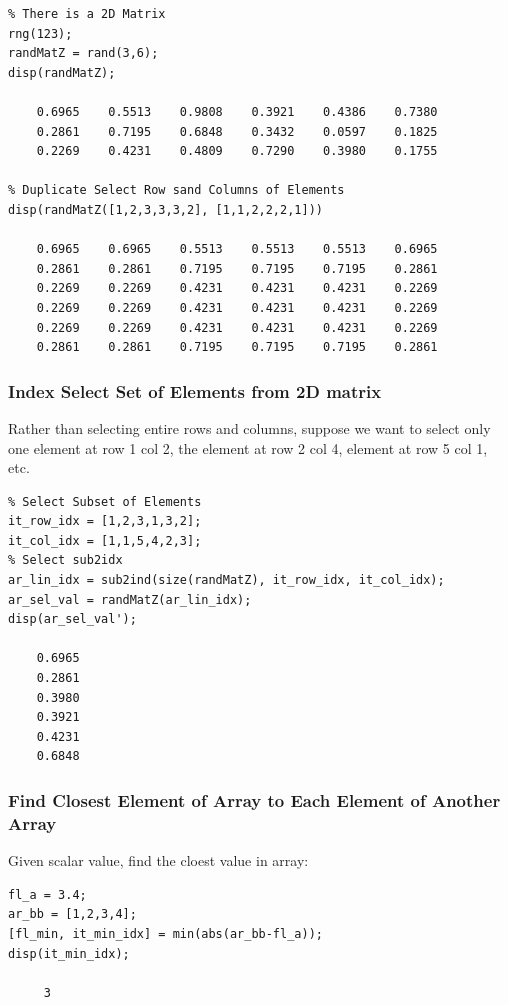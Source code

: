 \documentclass[
]{book}
\begin{document}
\begin{verbatim}
% There is a 2D Matrix
rng(123);
randMatZ = rand(3,6);
disp(randMatZ);

    0.6965    0.5513    0.9808    0.3921    0.4386    0.7380
    0.2861    0.7195    0.6848    0.3432    0.0597    0.1825
    0.2269    0.4231    0.4809    0.7290    0.3980    0.1755

% Duplicate Select Row sand Columns of Elements
disp(randMatZ([1,2,3,3,3,2], [1,1,2,2,2,1]))

    0.6965    0.6965    0.5513    0.5513    0.5513    0.6965
    0.2861    0.2861    0.7195    0.7195    0.7195    0.2861
    0.2269    0.2269    0.4231    0.4231    0.4231    0.2269
    0.2269    0.2269    0.4231    0.4231    0.4231    0.2269
    0.2269    0.2269    0.4231    0.4231    0.4231    0.2269
    0.2861    0.2861    0.7195    0.7195    0.7195    0.2861
\end{verbatim}

\hypertarget{index-select-set-of-elements-from-2d-matrix}{%
\subsubsection{Index Select Set of Elements from 2D matrix}\label{index-select-set-of-elements-from-2d-matrix}}

Rather than selecting entire rows and columns, suppose we want to select
only one element at row 1 col 2, the element at row 2 col 4, element at
row 5 col 1, etc.

\begin{verbatim}
% Select Subset of Elements
it_row_idx = [1,2,3,1,3,2];
it_col_idx = [1,1,5,4,2,3];
% Select sub2idx
ar_lin_idx = sub2ind(size(randMatZ), it_row_idx, it_col_idx);
ar_sel_val = randMatZ(ar_lin_idx);
disp(ar_sel_val');

    0.6965
    0.2861
    0.3980
    0.3921
    0.4231
    0.6848
\end{verbatim}

\hypertarget{find-closest-element-of-array-to-each-element-of-another-array}{%
\subsubsection{Find Closest Element of Array to Each Element of Another Array}\label{find-closest-element-of-array-to-each-element-of-another-array}}

Given scalar value, find the cloest value in array:

\begin{verbatim}
fl_a = 3.4;
ar_bb = [1,2,3,4];
[fl_min, it_min_idx] = min(abs(ar_bb-fl_a));
disp(it_min_idx);

     3
\end{verbatim}
\end{document}
